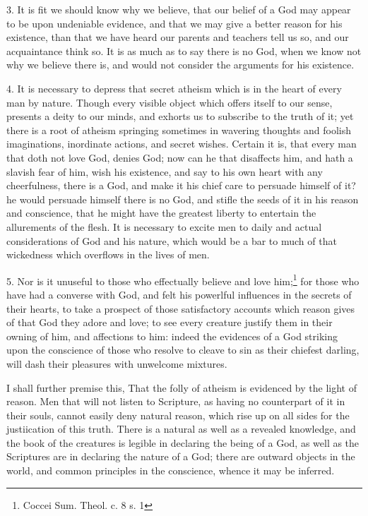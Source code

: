 \documentclass[a5paper]{book}
\begin{document}
3. It is fit we should know why we believe, 
    that our belief of a God may appear to be upon undeniable evidence, 
    and that we may give a better reason for his existence, 
    than that we have heard our %
    parents and teachers tell us so, and our acquaintance think so. 
It is as much as to say there is no God, 
    when we know not why we believe there is, 
    and would not consider the arguments for his existence.

4. It is necessary to depress that secret atheism which is in the
    heart of every man by nature. 
Though every visible object which offers itself to our sense, 
    presents a deity to our minds, 
    and exhorts us to subscribe to the truth of it; 
    yet there is a root of atheism springing sometimes 
    in wavering thoughts and foolish imaginations, 
    inordinate actions, and secret wishes. 
Certain it is, that every man that doth not love God, denies God; 
    now can he that disaffects him, and hath a slavish fear of him, 
    wish his existence, and say to his own heart with any cheerfulness, 
    there is a God, and make it his chief care to persuade himself of it? 
    he would persuade himself there is no God, 
    and stifle the seeds of it in his reason and conscience, 
    that he might have the greatest liberty to entertain 
    the allurements of the flesh. 
It is necessary to excite men to daily and actual considerations 
    of God and his nature, 
    which would be a bar to much of that wickedness which overflows 
    in the lives of men.

5. Nor is it unuseful to those who effectually believe and love him;\footnote{
        Coccei Sum. Theol. c. 8 s. 1}
    for those who have had a converse with God, 
    and felt his powerlful influences in the secrets of their hearts, 
    to take a prospect of those satisfactory accounts 
    which reason gives of that God they adore and love; 
    to see every creature justify them in their owning of him, 
    and affections to him: 
    indeed the evidences of a God striking upon the conscience 
    of those who resolve to cleave to sin as their chiefest darling, 
    will dash their pleasures with unwelcome mixtures.

I shall further premise this, 
    That the folly of atheism is evidenced by the light of reason. 
Men that will not listen to Scripture, 
    as having no counterpart of it in their souls, 
    cannot easily deny natural reason, 
    which rise up on all sides for the justiication of this truth.
There is a natural as well as a revealed knowledge, 
    and the book of the creatures is legible in declaring the being of a God, 
    as well as the Scriptures are in declaring the nature of a God; 
    there are outward objects in the world, 
    and common principles in the conscience, whence it may be inferred.
\end{document}
